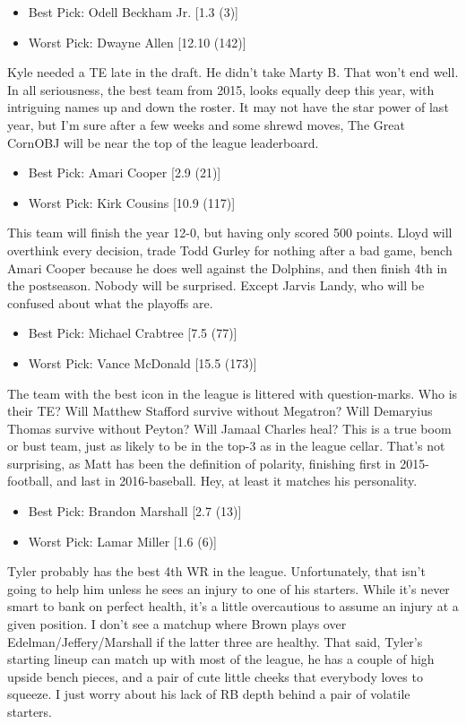 \documentclass[11pt,letterpaper]{article}
\begin{document}
\begin{itemize}
\item Best Pick: Odell Beckham Jr. [1.3 (3)]
\item Worst Pick: Dwayne Allen [12.10 (142)]
\end{itemize}
Kyle needed a TE late in the draft. He didn't take Marty B. That won't end well. In all seriousness, the best team from 2015, looks equally deep this year, with intriguing names up and down the roster. It may not have the star power of last year, but I'm sure after a few weeks and some shrewd moves, The Great CornOBJ will be near the top of the league leaderboard.

\begin{itemize}
\item Best Pick: Amari Cooper [2.9 (21)]
\item Worst Pick: Kirk Cousins [10.9 (117)]
\end{itemize}
This team will finish the year 12-0, but having only scored 500 points. Lloyd will overthink every decision, trade Todd Gurley for nothing after a bad game, bench Amari Cooper because he does well against the Dolphins, and then finish 4th in the postseason. Nobody will be surprised. Except Jarvis Landy, who will be confused about what the playoffs are.

\newpage
{}
\begin{itemize}
\item Best Pick: Michael Crabtree [7.5 (77)]
\item Worst Pick: Vance McDonald [15.5 (173)]
\end{itemize}
The team with the best icon in the league is littered with question-marks. Who is their TE? Will Matthew Stafford survive without Megatron? Will Demaryius Thomas survive without Peyton? Will Jamaal Charles heal? This is a true boom or bust team, just as likely to be in the top-3 as in the league cellar. That's not surprising, as Matt has been the definition of polarity, finishing first in 2015-football, and last in 2016-baseball. Hey, at least it matches his personality.

\begin{itemize}
\item Best Pick: Brandon Marshall [2.7 (13)]
\item Worst Pick: Lamar Miller [1.6 (6)]
\end{itemize}
Tyler probably has the best 4th WR in the league. Unfortunately, that isn't going to help him unless he sees an injury to one of his starters. While it's never smart to bank on perfect health, it's a little overcautious to assume an injury at a given position. I don't see a matchup where Brown plays over Edelman/Jeffery/Marshall if the latter three are healthy. That said, Tyler's starting lineup can match up with most of the league, he has a couple of high upside bench pieces, and a pair of cute little cheeks that everybody loves to squeeze. I just worry about his lack of RB depth behind a pair of volatile starters.
\end{document}

